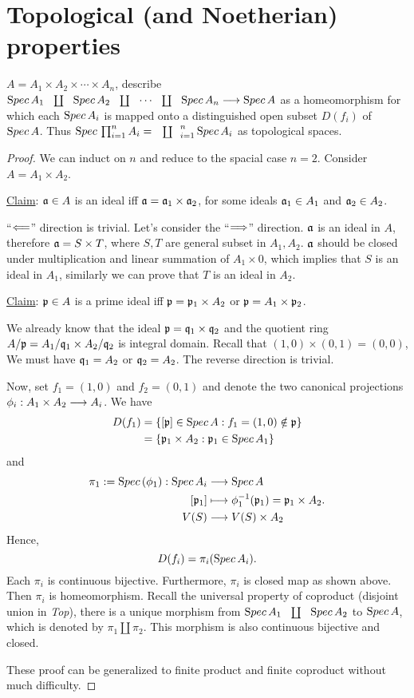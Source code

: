 \documentclass[11pt,fleqn]{book}
\begin{document}
\section{Topological (and Noetherian) properties}
\begin{exr}\label{exr:nonconnected_scheme}
$A = A_1 \times A_2 \times\cdots \times A_n$, describe $
\spec A_1\coprod \spec A_2\coprod \cdots \coprod\spec A_n\lrta \spec A$ as a homeomorphism for which each ${\text Spec\,} A_i $ is mapped onto a distinguished open subset $D(f_i)$ of ${\text Spec\,} A$. Thus $\spec \prod^n_{i=1}A_i=\coprod^n_{i=1}\spec A_i$ as topological spaces.
\end{exr}
\begin{proof}
We can induct on $n$ and reduce to the spacial case $n=2$. Consider $A=A_1\times A_2$. 

\underline{Claim}: ${\mathfrak a}\in A$ is an ideal iff ${\mathfrak a}={\mathfrak a}_1\times {\mathfrak a}_2$, for some ideals ${\mathfrak a}_1\in A_1$ and ${\mathfrak a}_2\in A_2$.

``$\Longleftarrow$'' direction is trivial. Let's consider the ``$\Longrightarrow$'' direction. ${\mathfrak a}$ is an ideal in $A$, therefore ${\mathfrak a}=S\times T$, where $S,T$ are general subset in $A_1,A_2$. ${\mathfrak a}$ should be closed under multiplication and linear summation of $A_1\times 0$, which implies that $S$ is an ideal in $A_1$, similarly we can prove that $T$ is an ideal in $A_2$.

\underline{Claim}: ${\mathfrak p}\in A$ is a prime ideal iff ${\mathfrak p}={\mathfrak p}_1\times A_2$ or ${\mathfrak p}=A_1\times {\mathfrak p}_2$.

We already know that the ideal ${\mathfrak p}=\mathfrak q_1\times \mathfrak q_2$ and the quotient ring $A/{\mathfrak p}=A_1/\mathfrak q_1\times A_2/\mathfrak q_2$ is integral domain. Recall that $(1,0)\times (0,1)=(0,0)$, We must have $\mathfrak q_1=A_2$ or $\mathfrak q_2=A_2$. The reverse direction is trivial.

Now, set $f_1=(1,0)$ and $f_2=(0,1)$ and denote the two canonical projections $\phi_i:A_1\times A_2\longrightarrow A_i$. We have
$$
\begin{aligned}
D(f_1)&=\{[{\mathfrak p}]\in {\text Spec\,} A: f_1=(1,0)\notin{\mathfrak p}\}\\
&=\{{\mathfrak p}_1\times A_2:{\mathfrak p}_1\in {\text Spec\,} A_1\}
\end{aligned}
$$ 
and 
$$
\begin{aligned}
\pi_1:=\spec(\phi_1):\spec A_i&\lrta \spec A\\
[\scp_1]&\longmapsto \phi_1^{-1}(\scp_1)=\scp_1\times A_2.\\
V(S)&\lrta V(S)\times A_2
\end{aligned}
$$
Hence,
$$
D(f_i)=\pi_i({\text Spec\,} A_i).
$$
Each $\pi_i$ is continuous bijective. Furthermore, $\pi_i$ is closed map as shown above. Then $\pi_i$ is homeomorphism. 
Recall the universal property of coproduct (disjoint union in \textit{Top}), there is a unique morphism from $\spec A_1\coprod\spec A_2$ to ${\text Spec\,} A$, which is denoted by $\pi_1\coprod \pi_2$. This morphism is also continuous bijective and closed.

These proof can be generalized to finite product and finite coproduct without much difficulty.
\end{proof}
\end{document}
